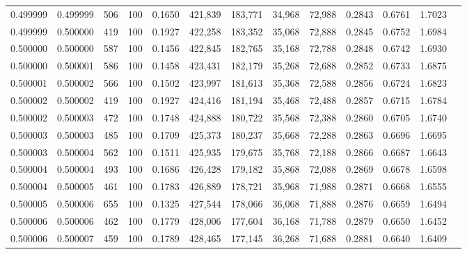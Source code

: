 \begin{tabular}{rrrrrrrrrrrrr}
0.499999 & 0.499999 &   506 & 100 &                                     0.1650 & 421,839 & 183,771 &  34,968 &  72,988 & 0.2843 & 0.6761 & 1.7023 \\
0.499999 & 0.500000 &   419 & 100 &                                     0.1927 & 422,258 & 183,352 &  35,068 &  72,888 & 0.2845 & 0.6752 & 1.6984 \\
0.500000 & 0.500000 &   587 & 100 &                                     0.1456 & 422,845 & 182,765 &  35,168 &  72,788 & 0.2848 & 0.6742 & 1.6930 \\
0.500000 & 0.500001 &   586 & 100 &                                     0.1458 & 423,431 & 182,179 &  35,268 &  72,688 & 0.2852 & 0.6733 & 1.6875 \\
0.500001 & 0.500002 &   566 & 100 &                                     0.1502 & 423,997 & 181,613 &  35,368 &  72,588 & 0.2856 & 0.6724 & 1.6823 \\
0.500002 & 0.500002 &   419 & 100 &                                     0.1927 & 424,416 & 181,194 &  35,468 &  72,488 & 0.2857 & 0.6715 & 1.6784 \\
0.500002 & 0.500003 &   472 & 100 &                                     0.1748 & 424,888 & 180,722 &  35,568 &  72,388 & 0.2860 & 0.6705 & 1.6740 \\
0.500003 & 0.500003 &   485 & 100 &                                     0.1709 & 425,373 & 180,237 &  35,668 &  72,288 & 0.2863 & 0.6696 & 1.6695 \\
0.500003 & 0.500004 &   562 & 100 &                                     0.1511 & 425,935 & 179,675 &  35,768 &  72,188 & 0.2866 & 0.6687 & 1.6643 \\
0.500004 & 0.500004 &   493 & 100 &                                     0.1686 & 426,428 & 179,182 &  35,868 &  72,088 & 0.2869 & 0.6678 & 1.6598 \\
0.500004 & 0.500005 &   461 & 100 &                                     0.1783 & 426,889 & 178,721 &  35,968 &  71,988 & 0.2871 & 0.6668 & 1.6555 \\
0.500005 & 0.500006 &   655 & 100 &                                     0.1325 & 427,544 & 178,066 &  36,068 &  71,888 & 0.2876 & 0.6659 & 1.6494 \\
0.500006 & 0.500006 &   462 & 100 &                                     0.1779 & 428,006 & 177,604 &  36,168 &  71,788 & 0.2879 & 0.6650 & 1.6452 \\
0.500006 & 0.500007 &   459 & 100 &                                     0.1789 & 428,465 & 177,145 &  36,268 &  71,688 & 0.2881 & 0.6640 & 1.6409 \\

\end{tabular}
